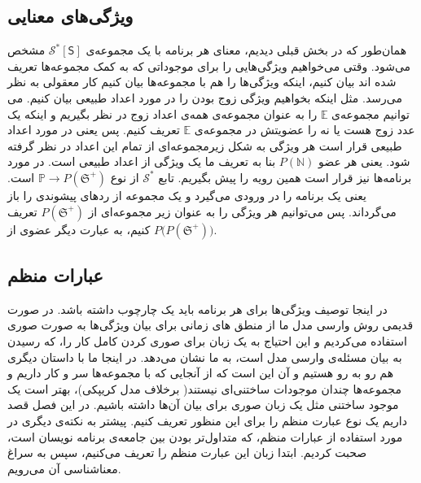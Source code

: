 \subsection{ویژگی‌های معنایی}
همان‌طور که در بخش قبلی دیدیم، معنای هر برنامه با یک مجموعه‌ی 
$\mathcal{S^*} [\mathsf{S}]$
مشخص می‌شود. وقتی می‌خواهیم ویژگی‌هایی را برای موجوداتی که به کمک مجموعه‌ها تعریف شده اند بیان کنیم، اینکه ویژگی‌ها را هم با مجموعه‌ها بیان کنیم کار معقولی به نظر می‌رسد. مثل اینکه بخواهیم ویژگی زوج بودن را در مورد اعداد طبیعی بیان کنیم. می توانیم مجموعه‌ی $\mathbb{E}$ را به عنوان مجموعه‌ی همه‌ی اعداد زوج در نظر بگیریم و اینکه یک عدد زوج هست یا نه را عضویتش در مجموعه‌ی $\mathbb{E}$ تعریف کنیم. پس یعنی در مورد اعداد طبیعی قرار است هر ویژگی به شکل زیرمجموعه‌ای از تمام این اعداد در نظر گرفته شود. یعنی هر عضو 
$\mathit{P}(\mathbb{N})$
بنا به تعریف ما یک ویژگی از اعداد طبیعی است.
در مورد برنامه‌ها نیز قرار است همین رویه را پیش بگیریم. تابع 
$\mathcal{S^*}$
از نوع 
$\mathbb{P} \rightarrow \mathit{P}(\mathfrak{S^+})$
است. یعنی یک برنامه را در ورودی می‌گیرد و یک مجموعه از ردهای پیشوندی را باز می‌گرداند. پس می‌توانیم هر ویژگی را به عنوان زیر مجموعه‌ای از 
$\mathit{P}(\mathfrak{S^+})$
تعریف کنیم، به عبارت دیگر عضوی از
$\mathit{P(P}(\mathfrak{S^+}))$.

\subsection{عبارات منظم}
در اینجا توصیف ویژگی‌ها برای هر برنامه باید یک چارچوب داشته باشد. در صورت قدیمی روش وارسی مدل ما از منطق های زمانی برای بیان ویژگی‌ها به صورت صوری استفاده می‌کردیم و این احتیاج به یک زبان برای صوری کردن کامل کار را، که رسیدن به بیان مسئله‌ی وارسی مدل است، به ما نشان می‌دهد. در اینجا ما با داستان دیگری هم رو به رو هستیم و آن این است که از آنجایی که با مجموعه‌ها سر و کار داریم و مجموعه‌ها چندان موجودات ساختنی‌ای نیستند( برخلاف مدل کریپکی)، بهتر است یک موجود ساختنی مثل یک زبان صوری برای بیان آن‌ها داشته باشیم. در این فصل قصد داریم یک نوع عبارت منظم را برای این منظور تعریف کنیم. پیشتر به نکته‌ی دیگری در مورد استفاده از عبارات منظم، که متداول‌تر بودن بین جامعه‌ی برنامه نویسان است، صحبت کردیم. ابتدا زبان این عبارت منظم را تعریف می‌کنیم، سپس به سراغ معناشناسی آن می‌رویم. 
